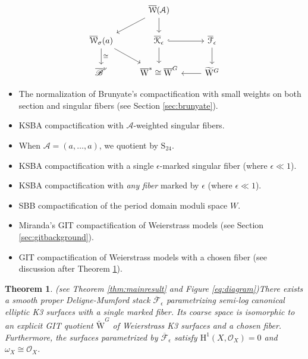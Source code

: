\documentclass[11pt]{amsart}
\newtheorem{theorem}{Theorem}[section]
\theoremstyle{definition}
\theoremstyle{remark}
\newcommand{\calO}{\mathcal O}
\newcommand{\calA}{\mathcal A}
\newcommand{\calW}{\mathcal W}
\newcommand{\oMG}{\overline{\mathrm{W}}^G}
\newcommand{\sbb}{\overline{\mathrm{W}}^{*}}
\newcommand{\ka}{\overline{\calW}(\calA)}
\newcommand{\ska}{\overline{\calW}_\sigma(a)}
\newcommand{\ke}{\overline{\mathcal{K}}_{\epsilon}}
\newcommand{\fe}{\overline{\mathcal{F}}_\epsilon}
\newcommand{\bru}{\overline{\mathscr{B}}}
\newcommand{\km}{\fe}
\newcommand{\oMGd}{\widetilde{\mathrm{W}}^G}
\renewcommand{\footnotesize}{\scriptsize}
\begin{document}
	\medskip
	
	
	
	\begin{minipage}{0.45\textwidth}
		
		\begin{equation}\label{eq:diagram}
			\begin{tikzcd}
				& \ka \ar[d] \ar[ld]  \\
				\ska \ar[rd] \ar[d,"\cong"] & \ke \ar[d] \ar[hookrightarrow]{r}& \km \ar[d] \\
				\bru^\nu  & \sbb \cong \oMG & \oMGd \ar[l] \end{tikzcd} \end{equation}
	\end{minipage}
	\begin{minipage}{0.45\textwidth}
		\footnotesize
		\begin{itemize}
			\item[$\bru^\nu$:] The normalization of  Brunyate's compactification with small weights on both section and singular fibers (see Section \ref{sec:brunyate}).
			\item[$\ka$:] KSBA compactification with $\calA$-weighted singular fibers.
			\item[$\ska$:] When $\calA = (a, \dots, a)$, we quotient by $\mathrm{S}_{24}$. 
			\item[$\ke$:] KSBA compactification with a single $\epsilon$-marked singular fiber (where $\epsilon \ll 1$).
			\item[$\km$:] KSBA compactification with \emph{any fiber} marked by $\epsilon$ (where $\epsilon \ll 1$).
			\item[$\sbb$:] SBB compactification of the period domain moduli space $W$.
			\item[$\oMG$:] Miranda's GIT compactification of Weierstrass models (see Section \ref{sec:gitbackground}).
			\item[$\oMGd$:] GIT compactification of Weierstrass models with a chosen fiber (see discussion after Theorem \ref{thm:mainintro}).
		\end{itemize}
	\end{minipage}
	
	\medskip
	\medskip
	
	
	\begin{theorem}(see Theorem \ref{thm:mainresult} and Figure \ref{eq:diagram})\label{thm:mainintro} There exists a smooth proper Deligne-Mumford stack $\km$ parametrizing semi-log canonical elliptic K3 surfaces with a single marked fiber. Its coarse space is isomorphic to an explicit GIT quotient $\oMGd$ of Weierstrass K3 surfaces and a chosen fiber. Furthermore, the surfaces parametrized by $\km$ satisfy $\mathrm{H}^1(X, \calO_X) = 0$ and $\omega_X \cong \calO_X$.
	\end{theorem}
	
\end{document}
